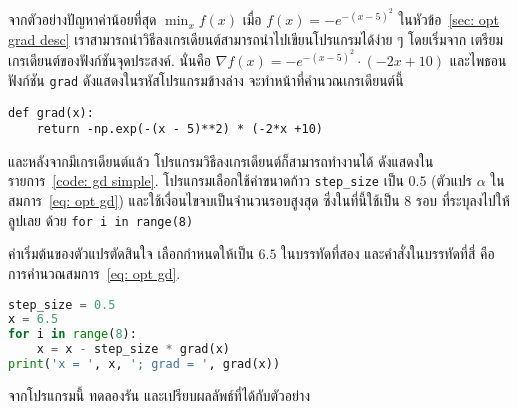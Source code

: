 \begin{Exercise}
	\label{ex: opt gd simple code}
	
	จากตัวอย่างปัญหาค่าน้อยที่สุด $\min_x f(x)$ เมื่อ $f(x) = -e^{-(x-5)^2}$
	ในหัวข้อ~\ref{sec: opt grad desc}
	เราสามารถนำวิธีลงเกรเดียนต์สามารถนำไปเขียนโปรแกรมได้ง่าย ๆ โดยเริ่มจาก
	เตรียมเกรเดียนต์ของฟังก์ชันจุดประสงค์.
	นั่นคือ $\nabla f(x) = -e^{-(x-5)^2} \cdot (-2x + 10)$
	และไพธอนฟังก์ชัน \texttt{grad} ดังแสดงในรหัสโปรแกรมข้างล่าง จะทำหน้าที่คำนวณเกรเดียนต์นี้
\begin{Verbatim}[fontsize=\small]
def grad(x):
    return -np.exp(-(x - 5)**2) * (-2*x +10)
\end{Verbatim}
	และหลังจากมีเกรเดียนต์แล้ว 
	โปรแกรมวิธีลงเกรเดียนต์ก็สามารถทำงานได้
	ดังแสดงในรายการ~\ref{code: gd simple}. 
	โปรแกรมเลือกใช้ค่าขนาดก้าว  \verb|step_size| เป็น $0.5$ (ตัวแปร $\alpha$ ในสมการ~\ref{eq: opt gd})
	และใช้เงื่อนไขจบเป็นจำนวนรอบสูงสุด ซึ่งในที่นี้ใช้เป็น $8$ รอบ ที่ระบุลงไปให้ลูปเลย ด้วย \texttt{for i in range(8)}
	
	ค่าเริ่มต้นของตัวแปรตัดสินใจ เลือกกำหนดให้เป็น $6.5$ ในบรรทัดที่สอง
	และคำสั่งในบรรทัดที่สี่ %
	คือการคำนวณสมการ~\ref{eq: opt gd}.
	\begin{lstlisting}[language=Python, caption={[วิธีลงเกรเดียนต์]ตัวอย่างโปรแกรม วิธีลงเกรเดียนต์อย่างง่าย ๆ},
	label={code: gd simple}]
step_size = 0.5
x = 6.5
for i in range(8):
    x = x - step_size * grad(x) 
print('x = ', x, '; grad = ', grad(x))
	\end{lstlisting}
	
	จากโปรแกรมนี้ ทดลองรัน และเปรียบผลลัพธ์ที่ได้กับตัวอย่าง
	
\end{Exercise}


